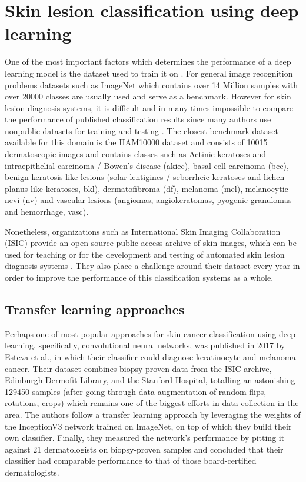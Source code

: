 \section{Skin lesion classification using deep learning}
One of the most important factors which determines the performance of a deep learning model is the dataset used to train it on \cite{?}. For general image recognition problems datasets such as ImageNet \cite{Deng2010} which contains over 14 Million samples with over 20000 classes are usually used and serve as a benchmark. However for skin lesion diagnosis systems, it is difficult and in many times impossible to compare the performance of published classification results since many authors use nonpublic datasets for training and testing \cite{Brinker2018}. The closest benchmark dataset available for this domain is the HAM10000 dataset \cite{ham10000} and consists of 10015 dermatoscopic images and contains classes such as Actinic keratoses and intraepithelial carcinoma / Bowen's disease (akiec), basal cell carcinoma (bcc), benign keratosis-like lesions (solar lentigines / seborrheic keratoses and lichen-planus like keratoses, bkl), dermatofibroma (df), melanoma (mel), melanocytic nevi (nv) and vascular lesions (angiomas, angiokeratomas, pyogenic granulomas and hemorrhage, vasc).\par
Nonetheless, organizations such as International Skin Imaging Collaboration (ISIC) provide an open source public access archive of skin images, which can be used for teaching or for the development and testing of automated skin lesion diagnosis systems \cite{isic2019}. They also place a challenge around their dataset every year in order to improve the performance of this classification systems as a whole. \par
\subsection{Transfer learning approaches}
Perhaps one of most popular approaches for skin cancer classification using deep learning, specifically, convolutional neural networks, was published in 2017 by Esteva et al.\cite{Esteva2017}, in which their classifier could diagnose keratinocyte and melanoma cancer. Their dataset combines biopsy-proven data from the ISIC archive, Edinburgh Dermofit Library, and the Stanford Hospital, totalling an astonishing 129450 samples (after going through data augmentation of random flips, rotations, crops) which remains one of the biggest efforts in data collection in the area.  The authors follow a transfer learning approach by leveraging the weights of the InceptionV3 network trained on ImageNet, on top of which they build their own classifier. Finally, they measured the network's performance by pitting it against 21 dermatologists on biopsy-proven samples and concluded that their classifier had comparable performance to that of those board-certified dermatologists.\par

